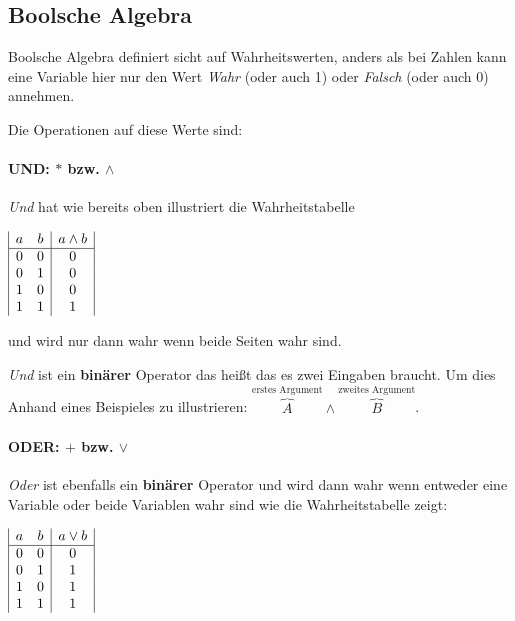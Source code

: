 \documentclass{article}
\begin{document}
\begin{tabular}{  p{.50\linewidth}  p{.50\linewidth} }
    \\

\end{tabular}

\subsection{Boolsche Algebra}



Boolsche Algebra definiert sicht auf Wahrheitswerten, anders als bei Zahlen kann eine Variable hier nur den Wert \emph{Wahr} (oder auch 1)
oder \emph{Falsch} (oder auch 0) annehmen.

Die Operationen auf diese Werte sind:

\paragraph{UND: $*$ bzw. $\land$}

\emph{Und} hat wie bereits oben illustriert die Wahrheitstabelle 

\begin{center}
$\begin{array}{|c c |c|}
    a & b & a \land b \\ 
    \hline 
    0 & 0 & 0 \\
    0 & 1 & 0 \\
    1 & 0 & 0 \\
    1 & 1 & 1 \\

\end{array}$
\end{center}
und wird nur dann wahr wenn beide Seiten wahr sind.

\emph{Und} ist ein \textbf{binärer} Operator das heißt das es zwei Eingaben braucht. Um dies Anhand eines Beispieles zu illustrieren: $\overset{\text{erstes Argument}}{\overbrace{A}} \land \overset{\text{zweites Argument}}{\overbrace{B}}$.

\paragraph{ODER: $+$ bzw. $\lor$}

\emph{Oder} ist ebenfalls ein \textbf{binärer} Operator und wird dann wahr wenn entweder eine Variable oder beide Variablen wahr sind wie die Wahrheitstabelle zeigt:

\begin{center}
$\begin{array}{|c c |c|}
    a & b & a \lor b \\ 
    \hline 
    0 & 0 & 0 \\
    0 & 1 & 1 \\
    1 & 0 & 1 \\
    1 & 1 & 1 \\

\end{array}$
\end{center}
\end{document}
